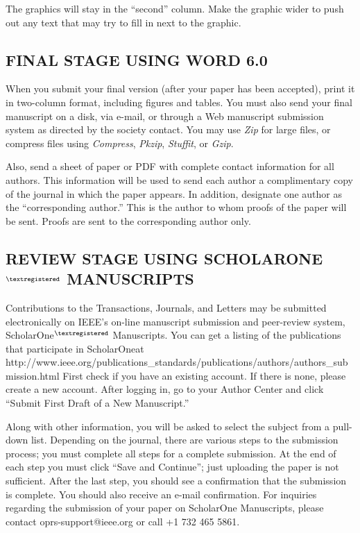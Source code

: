 \documentclass{IEEEjmw}
\begin{document}
The graphics will stay in the ``second'' column. Make the graphic wider to push out any text that may try to fill in next to the graphic.

\subsection{FINAL STAGE USING WORD 6.0}

When you submit your final version (after your paper has been accepted), print it in two-column format, including figures and tables. You must also send your final manuscript on a disk, via e-mail, or through a Web manuscript submission system as directed by the society contact. You may use {\it Zip} for large files, or compress files using {\it Compress}, {\it Pkzip}, {\it Stuffit}, or {\it Gzip}. 

Also, send a sheet of paper or PDF with complete contact information for all authors. This information will be used to send each author a complimentary copy of the journal in which the paper appears. In addition, designate one author as the ``corresponding author.'' This is the author to whom proofs of the paper will be sent. Proofs are sent to the corresponding author only.

\subsection{REVIEW STAGE USING SCHOLARONE$^{\scriptsize\textregistered}$ MANUSCRIPTS}

Contributions to the Transactions, Journals, and Letters may be submitted electronically on IEEE's on-line manuscript submission and peer-review system, ScholarOne$^{\scriptsize\textregistered}$ Manuscripts. You can get a listing of the publications that participate in ScholarOne\break at http://www.ieee.org/publications\_standards/publications/\break authors/authors\_submission.html First check if you have an existing account. If there is none, please create a new account. After logging in, go to your Author Center and click ``Submit First Draft of a New Manuscript.'' 



Along with other information, you will be asked to select the subject from a pull-down list. Depending on the journal, there are various steps to the submission process; you must complete all steps for a complete submission. At the end of each step you must click ``Save and Continue''; just uploading the paper is not sufficient. After the last step, you should see a confirmation that the submission is complete. You should also receive an e-mail confirmation. For inquiries regarding the submission of your paper on ScholarOne Manuscripts, please contact oprs-support@ieee.org or call +1 732 465 5861.
\end{document}
